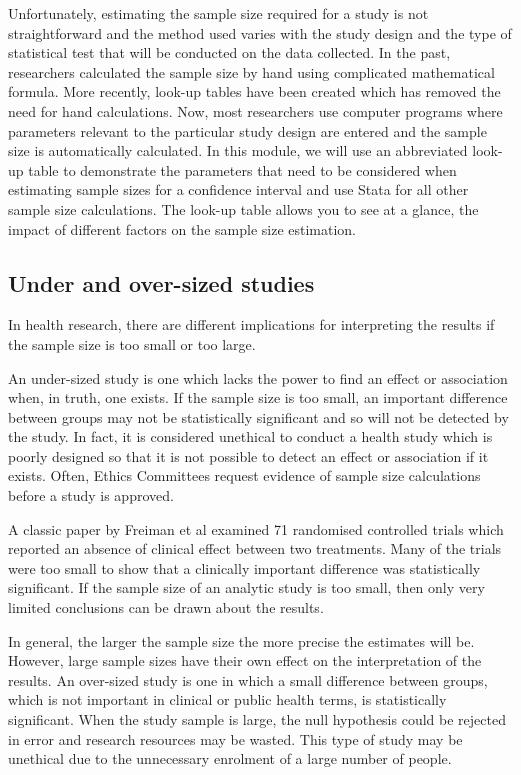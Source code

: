 \documentclass[
]{memoir}
\begin{document}
Unfortunately, estimating the sample size required for a study is not straightforward and the method used varies with the study design and the type of statistical test that will be conducted on the data collected. In the past, researchers calculated the sample size by hand using complicated mathematical formula. More recently, look-up tables have been created which has removed the need for hand calculations. Now, most researchers use computer programs where parameters relevant to the particular study design are entered and the sample size is automatically calculated. In this module, we will use an abbreviated look-up table to demonstrate the parameters that need to be considered when estimating sample sizes for a confidence interval and use Stata for all other sample size calculations. The look-up table allows you to see at a glance, the impact of different factors on the sample size estimation.

\hypertarget{under-and-over-sized-studies}{%
\subsection{Under and over-sized studies}\label{under-and-over-sized-studies}}

In health research, there are different implications for interpreting the results if the sample size is too small or too large.

An under-sized study is one which lacks the power to find an effect or association when, in truth, one exists. If the sample size is too small, an important difference between groups may not be statistically significant and so will not be detected by the study. In fact, it is considered unethical to conduct a health study which is poorly designed so that it is not possible to detect an effect or association if it exists. Often, Ethics Committees request evidence of sample size calculations before a study is approved.

A classic paper by Freiman et al examined 71 randomised controlled trials which reported an absence of clinical effect between two treatments.\citep{freiman_etal78} Many of the trials were too small to show that a clinically important difference was statistically significant. If the sample size of an analytic study is too small, then only very limited conclusions can be drawn about the results.

In general, the larger the sample size the more precise the estimates will be. However, large sample sizes have their own effect on the interpretation of the results. An over-sized study is one in which a small difference between groups, which is not important in clinical or public health terms, is statistically significant. When the study sample is large, the null hypothesis could be rejected in error and research resources may be wasted. This type of study may be unethical due to the unnecessary enrolment of a large number of people.
\end{document}
